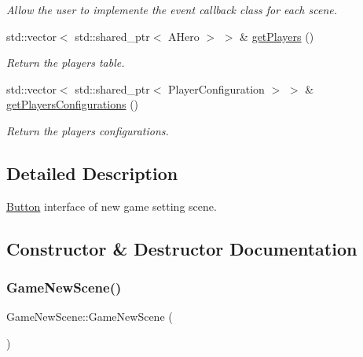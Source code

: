 \begin{DoxyCompactItemize}
\begin{DoxyCompactList}\small\item\em Allow the user to implemente the event callback class for each scene. \end{DoxyCompactList}\item 
\mbox{\label{classGameNewScene_a2fb7cacfacbf5c565c3e2f98bd06aec4}} 
std\+::vector$<$ std\+::shared\+\_\+ptr$<$ A\+Hero $>$ $>$ \& \hyperlink{classGameNewScene_a2fb7cacfacbf5c565c3e2f98bd06aec4}{get\+Players} ()
\begin{DoxyCompactList}\small\item\em Return the players table. \end{DoxyCompactList}\item 
\mbox{\label{classGameNewScene_acdc1143af5b39c91d941cf77777d2e5b}} 
std\+::vector$<$ std\+::shared\+\_\+ptr$<$ Player\+Configuration $>$ $>$ \& \hyperlink{classGameNewScene_acdc1143af5b39c91d941cf77777d2e5b}{get\+Players\+Configurations} ()
\begin{DoxyCompactList}\small\item\em Return the players configurations. \end{DoxyCompactList}\end{DoxyCompactItemize}


\subsection{Detailed Description}
\hyperlink{classButton}{Button} interface of new game setting scene. 

\subsection{Constructor \& Destructor Documentation}
\mbox{\label{classGameNewScene_af482b13a2d9e315ef39a6e41293bf4fb}} 
\subsubsection{\texorpdfstring{Game\+New\+Scene()}{GameNewScene()}}
{\footnotesize\ttfamily Game\+New\+Scene\+::\+Game\+New\+Scene (\begin{DoxyParamCaption}{ }\end{DoxyParamCaption})}



